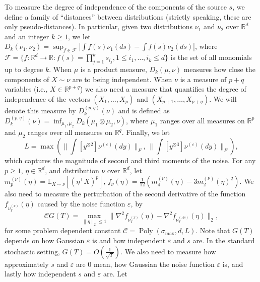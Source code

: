 \documentclass{article} %
\newcommand{\real}{\mathbb{R}}
\DeclareMathOperator{\pol}{Poly}
\newcommand{\poly}[1]{\pol\left(#1\right)}
\newcommand{\E}{\mathbb{E}}
\renewcommand{\epsilon}{\varepsilon}
\theoremstyle{definition}
\begin{document}
To measure the degree of independence of the components of the source $s$, we define
a family of ``distances'' between distributions (strictly speaking, these are only pseudo-distances).
In particular, given two distributions $\nu_1$ and $\nu_2$ over $\real^d$ and an integer $k\ge 1$, we
let $D_k(\nu_1,\nu_2) = \sup_{f\in\mathcal{F}} |\int f(s)\nu_1(ds) - \int f(s)\nu_2(ds)|$, 
where $\mathcal{F}=\{f:\real^d \to \real : f(s)=\prod_{j=1}^k s_{i_j}, 1 \le i_1,\ldots,i_k \le d\}$ 
is the set of all monomials up to degree $k$.
When $\mu$ is a product measure, $D_k(\mu,\nu)$ measures how close the components of $X\sim \nu$ are to being independent.
When $\nu$ is a measure of $p+q$ variables (i.e., $X\in \real^{p+q}$) 
we also need a measure that quantifies the degree of independence of the vectors $(X_1,\dots,X_p)$ and $(X_{p+1},\dots,X_{p+q})$. We will denote this measure by $D_k^{(p,q)}(\nu)$ and is defined as $D_k^{(p,q)} (\nu)= \inf_{\mu_1,\mu_2} D_k(\mu_1\otimes \mu_2,\nu)$, where $\mu_1$ ranges over all measures on $\real^p$ and $\mu_2$ ranges over all measures on $\real^q$. 
Finally, we let 
\[
L = \max \left( \| \textstyle\int  [y^{\otimes 2}] \nu^{(\epsilon)}(dy) \|_F,\, 
			  \| \int  [y^{\otimes 3}] \nu^{(\epsilon)}(dy) \|_F \right),
\]
which captures the magnitude of second and third moments of the noise.
For any $p\ge 1$, $\eta\in \real^d$, and distribution $\nu$ over $\real^d$,
let 
$m_p^{(\nu)}(\eta) = \E_{X\sim \nu}[ (\eta^\top X)^p ],\, f_{\nu}(\eta) = \tfrac1{12} \left( m_4^{(\nu)}(\eta) - 3 m_2^{(\nu)}(\eta)^2 \right)$.
We also need to measure the perturbation of the second derivative of the function $f_{\nu_T^{(x)}}(\eta)$ caused by the noise function $\epsilon$, by 
\[
\mathcal{C}G(T) = \max_{\|\eta\|_2\le 1}\| \nabla^2f_{\nu_T^{(x)}}(\eta) - \nabla^2f_{\nu_T^{(As)}}(\eta) \|_2, 
\] 
for some problem dependent constant $\mathcal{C} = \poly{\sigma_{\max}, d, L}$. Note that $G(T)$ depends on how Gaussian $\epsilon$ is and how independent $\epsilon$ and $s$ are. 
In the standard stochastic setting, $G(T) = O(\frac{1}{\sqrt{T}})$.
\fi
%
We also need to measure how approximately $s$ and $\epsilon$ are 0 mean, how Gaussian the noise function $\epsilon$ is, and lastly how independent $s$ and $\epsilon$ are. Let 
\end{document}
